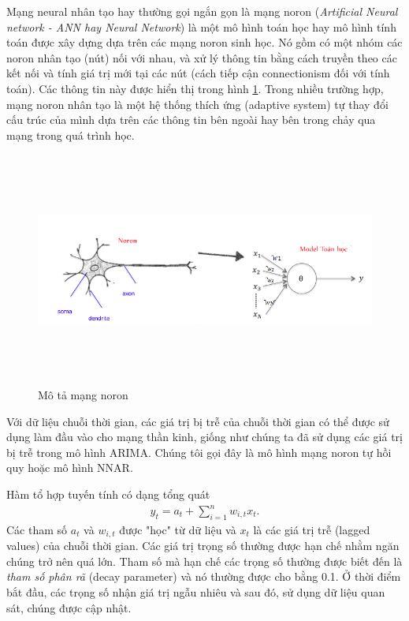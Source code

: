 \documentclass[12pt, a4paper,oneside]{book}
\theoremstyle{definition}
\begin{document}
Mạng neural nhân tạo hay thường gọi ngắn gọn là mạng noron (\textit{Artificial Neural network - ANN hay Neural Network}) là một mô hình toán học hay mô hình tính toán được xây dựng dựa trên các mạng noron sinh học. Nó gồm có một nhóm các noron nhân tạo (nút) nối với nhau, và xử lý thông tin bằng cách truyền theo các kết nối và tính giá trị mới tại các nút (cách tiếp cận connectionism đối với tính toán). Các thông tin này được hiển thị trong hình \ref{V7}. Trong nhiều trường hợp, mạng noron nhân tạo là một hệ thống thích ứng (adaptive system) tự thay đổi cấu trúc của mình dựa trên các thông tin bên ngoài hay bên trong chảy qua mạng trong quá trình học.
\begin{figure}[!htb]
	\centering
	\includegraphics[width=1\linewidth,height=7.7cm]{anh/noron}
	\vskip-4mm 
	\caption{Mô tả mạng noron}  
	\label{V7}
\end{figure}
Với dữ liệu chuỗi thời gian, các giá trị bị trễ của chuỗi thời gian có thể được sử dụng làm đầu vào cho mạng thần kinh, giống như chúng ta đã sử dụng các giá trị bị trễ trong mô hình ARIMA. Chúng tôi gọi đây là mô hình mạng noron tự hồi quy hoặc mô hình NNAR.

Hàm tổ hợp tuyến tính có dạng tổng quát
\begin{align*}
y_t = a_t + \sum_{i =1}^{n}w_{i, t}x_t.
\end{align*}
Các tham số $a_t$ và $w_{i, t}$ được "học" từ dữ liệu và $x_t$ là các giá trị trễ (lagged values) của chuỗi thời gian. Các giá trị trọng số thường được hạn chế nhằm ngăn chúng trở nên quá lớn. Tham số mà hạn chế các trọng số thường được biết đến là \textit{tham số phân rã} (decay parameter) và nó thường được cho bằng 0.1. Ở thời điểm bắt đầu, các trọng số nhận giá trị ngẫu nhiêu và sau đó, sử dụng dữ liệu quan sát, chúng được cập nhật.
\end{document}
